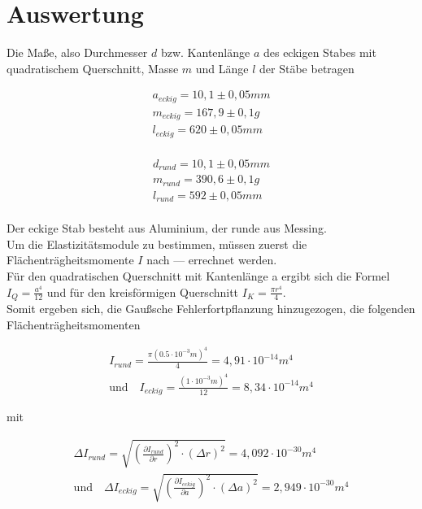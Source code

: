 \section{Auswertung}
\label{sec:Auswertung}

Die Maße, also Durchmesser $d$ bzw. Kantenlänge $a$ des eckigen Stabes mit quadratischem Querschnitt, Masse $m$ und Länge $l$ der Stäbe betragen

\begin{align*}
  a_{eckig} = 10,1 \pm 0,05mm \\
  m_{eckig} = 167,9 \pm 0,1g \\
  l_{eckig} = 620 \pm 0,05mm\\
\end{align*}

\begin{align*}
  d_{rund} = 10,1 \pm 0,05mm \\
  m_{rund} = 390,6 \pm 0,1g \\
  l_{rund} = 592 \pm 0,05mm \\
\end{align*}

Der eckige Stab besteht aus Aluminium, der runde aus Messing.\\
Um die Elastizitätsmodule zu bestimmen, müssen zuerst die Flächenträgheitsmomente $I$ nach --- errechnet werden.\\
Für den quadratischen Querschnitt mit Kantenlänge a ergibt sich die Formel $I_Q = \frac{a^4}{12}$ und 
für den kreisförmigen Querschnitt
$I_K = \frac{\pi r^4}{4}$. \\
Somit ergeben sich, die Gaußsche Fehlerfortpflanzung hinzugezogen, die folgenden Flächenträgheitsmomenten

\begin{align*}
  I_{rund} = \frac{\pi (0.5\cdot 10^{-3}m)^4}{4} = 4,91 \cdot 10^{-14}m^4 \quad \\
  \textrm{und} \quad I_{eckig} = \frac{(1 \cdot 10^{-3}m)^4}{12} = 8,34 \cdot 10^{-14}m^4
\end{align*}

mit 

\begin{align*}
  \varDelta I_{rund} =  \sqrt{ (\frac{\partial I_{rund}}{\partial r})^2 \cdot (\varDelta r)^2} = 4,092 \cdot 10^{-30} m^4 \\
  \textrm{und} \quad \varDelta I_{eckig} = \sqrt{ (\frac{\partial I_{eckig}}{\partial a})^2 \cdot (\varDelta a)^2} = 2,949 \cdot 10^{-30} m^4
\end{align*}

